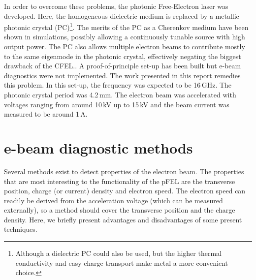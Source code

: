 In order to overcome these problems, the photonic Free-Electron laser was developed. Here, the homogeneous dielectric medium is replaced by a metallic photonic crystal (PC)\footnote{Although a dielectric PC could also be used, but the higher thermal conductivity and easy charge transport make metal a more convenient choice.}.
The merits of the PC as a Cherenkov medium have been shown in simulations, possibly allowing a continuously tunable source with high output power.
The PC also allows multiple electron beams to contribute mostly to the same eigenmode in the photonic crystal, effectively negating the biggest drawback of the CFEL.\cite{DenisMultiBeam}.
A proof-of-principle set-up has been built \cite{Denis} but e-beam diagnostics were not implemented. The work presented in this report remedies this problem.
In this set-up, the frequency was expected to be 16\,GHz. The photonic crystal period was 4.2\,mm. The electron beam was accelerated with voltages ranging from around 10\,kV up to 15\,kV and the beam current was measured to be around 1\,A.

\section{e-beam diagnostic methods}
Several methods exist to detect properties of the electron beam. The properties that are most interesting to the functionality of the pFEL are the transverse position, charge (or current) density and electron speed. The electron speed can readily be derived from the acceleration voltage (which can be measured externally), so a method should cover the transverse position and the charge density. 
Here, we briefly present advantages and disadvantages of some present techniques.

